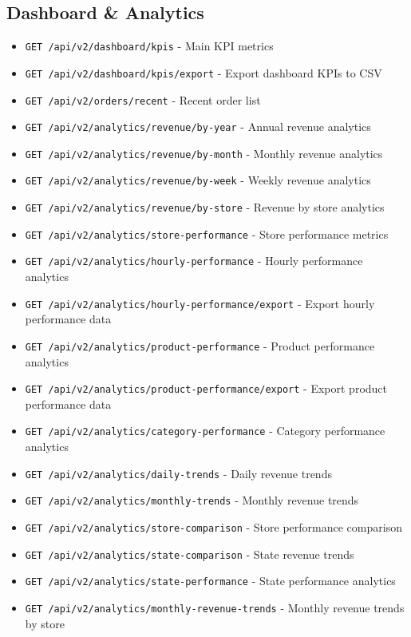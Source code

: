 \documentclass[11pt,a4paper]{article}
\begin{document}
\subsection{Dashboard \& Analytics}
\begin{itemize}[leftmargin=*]
    \item \texttt{GET /api/v2/dashboard/kpis} - Main KPI metrics
    \item \texttt{GET /api/v2/dashboard/kpis/export} - Export dashboard KPIs to CSV
    \item \texttt{GET /api/v2/orders/recent} - Recent order list
    \item \texttt{GET /api/v2/analytics/revenue/by-year} - Annual revenue analytics
    \item \texttt{GET /api/v2/analytics/revenue/by-month} - Monthly revenue analytics
    \item \texttt{GET /api/v2/analytics/revenue/by-week} - Weekly revenue analytics
    \item \texttt{GET /api/v2/analytics/revenue/by-store} - Revenue by store analytics
    \item \texttt{GET /api/v2/analytics/store-performance} - Store performance metrics
    \item \texttt{GET /api/v2/analytics/hourly-performance} - Hourly performance analytics
    \item \texttt{GET /api/v2/analytics/hourly-performance/export} - Export hourly performance data
    \item \texttt{GET /api/v2/analytics/product-performance} - Product performance analytics
    \item \texttt{GET /api/v2/analytics/product-performance/export} - Export product performance data
    \item \texttt{GET /api/v2/analytics/category-performance} - Category performance analytics
    \item \texttt{GET /api/v2/analytics/daily-trends} - Daily revenue trends
    \item \texttt{GET /api/v2/analytics/monthly-trends} - Monthly revenue trends
    \item \texttt{GET /api/v2/analytics/store-comparison} - Store performance comparison
    \item \texttt{GET /api/v2/analytics/state-comparison} - State revenue trends
    \item \texttt{GET /api/v2/analytics/state-performance} - State performance analytics
    \item \texttt{GET /api/v2/analytics/monthly-revenue-trends} - Monthly revenue trends by store
\end{itemize}
\end{document}
